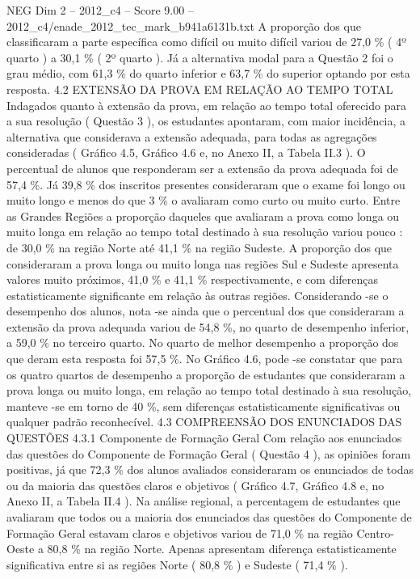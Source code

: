 \begin{textsample}{NEG Dim 2 – 2012\_c4 – Score 9.00 – 2012\_c4/enade\_2012\_tec\_mark\_b941a6131b.txt}
A proporção dos que classificaram a parte específica como difícil ou muito difícil variou de 27,0 \% ( 4º quarto ) a 30,1 \% ( 2º quarto ).
Já a alternativa modal para a Questão 2 foi o grau médio, com 61,3 \% do quarto inferior e 63,7 \% do superior optando por esta resposta. 4.2 EXTENSÃO DA PROVA EM RELAÇÃO AO TEMPO TOTAL Indagados quanto à extensão da prova, em relação ao tempo total oferecido para a sua resolução ( Questão 3 ), os estudantes apontaram, com maior incidência, a alternativa que considerava a extensão adequada, para todas as agregações consideradas ( Gráfico 4.5, Gráfico 4.6 e, no Anexo II, a Tabela II.3 ).
O percentual de alunos que responderam ser a extensão da prova adequada foi de 57,4 \%.
Já 39,8 \% dos inscritos presentes consideraram que o exame foi longo ou muito longo e menos do que 3 \% o avaliaram como curto ou muito curto.
Entre as Grandes Regiões a proporção daqueles que avaliaram a prova como longa ou muito longa em relação ao tempo total destinado à sua resolução variou pouco : de 30,0 \% na região Norte até 41,1 \% na região Sudeste.
A proporção dos que consideraram a prova longa ou muito longa nas regiões Sul e Sudeste apresenta valores muito próximos, 41,0 \% e 41,1 \% respectivamente, e com diferenças estatisticamente significante em relação às outras regiões.
Considerando -se o desempenho dos alunos, nota -se ainda que o percentual dos que consideraram a extensão da prova adequada variou de 54,8 \%, no quarto de desempenho inferior, a 59,0 \% no terceiro quarto.
No quarto de melhor desempenho a proporção dos que deram esta resposta foi 57,5 \%.
No Gráfico 4.6, pode -se constatar que para os quatro quartos de desempenho a proporção de estudantes que consideraram a prova longa ou muito longa, em relação ao tempo total destinado à sua resolução, manteve -se em torno de 40 \%, sem diferenças estatisticamente significativas ou qualquer padrão reconhecível. 4.3 COMPREENSÃO DOS ENUNCIADOS DAS QUESTÕES 4.3.1 Componente de Formação Geral Com relação aos enunciados das questões do Componente de Formação Geral ( Questão 4 ), as opiniões foram positivas, já que 72,3 \% dos alunos avaliados consideraram os enunciados de todas ou da maioria das questões claros e objetivos ( Gráfico 4.7, Gráfico 4.8 e, no Anexo II, a Tabela II.4 ).
Na análise regional, a percentagem de estudantes que avaliaram que todos ou a maioria dos enunciados das questões do Componente de Formação Geral estavam claros e objetivos variou de 71,0 \% na região Centro-Oeste a 80,8 \% na região Norte.
Apenas apresentam diferença estatisticamente significativa entre si as regiões Norte ( 80,8 \% ) e Sudeste ( 71,4 \% ).

\end{textsample}
